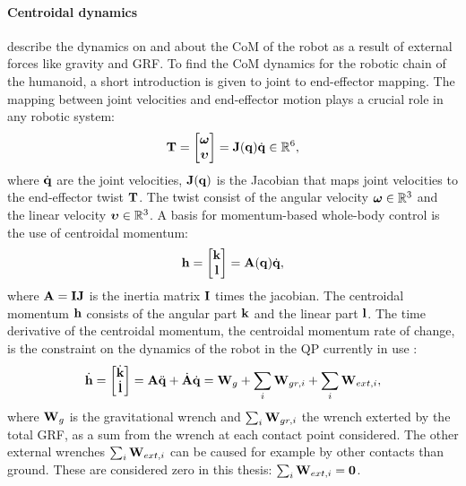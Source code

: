 \paragraph{Centroidal dynamics} \cite{orin2013centroidal} describe the dynamics on and about the \ac{CoM} of the robot as a result of external forces like gravity and \ac{GRF}. To find the \ac{CoM} dynamics for the robotic chain of the humanoid, a short introduction is given to joint to end-effector mapping. The mapping between joint velocities and end-effector motion plays a crucial role in any robotic system:
\begin{equation}\label{eq:jacobian}
\mathbf{T}=\begin{bmatrix}\boldsymbol{\omega} \\ \boldsymbol{\upsilon} \end{bmatrix} = \mathbf{J}(\mathbf{q})\dot{\mathbf{q}} \in \mathbb{R}^6,
\end{equation}
where $\dot{\mathbf{q}}$ are the joint velocities, $\mathbf{J}(\mathbf{q})$ is the Jacobian that maps joint velocities to the end-effector twist $\mathbf{T}$. The twist consist of the angular velocity $\boldsymbol{\omega} \in \mathbb{R}^3$ and the linear velocity $\boldsymbol{\upsilon} \in \mathbb{R}^3$. A basis for momentum-based whole-body control is the use of centroidal momentum:
\begin{equation}
\mathbf{h}=\begin{bmatrix}\mathbf{k} \\ \mathbf{l} \end{bmatrix} =\mathbf{A}(\mathbf{q})\dot{\mathbf{q}},
\end{equation}
 where $\mathbf{A}=\mathbf{I}\mathbf{J}$ is the inertia matrix $\mathbf{I}$ times the jacobian. The centroidal momentum $\mathbf{h}$ consists of the angular part $\mathbf{k}$ and the linear part $\mathbf{l}$. The time derivative of the centroidal momentum, the centroidal momentum rate of change, is the constraint on the dynamics of the robot in the \ac{QP} currently in use \cite{koolen2016design}:
\begin{equation}
\dot{\mathbf{h}}=\begin{bmatrix}\dot{\mathbf{k}}\\ \dot{\mathbf{l}} \end{bmatrix} =\mathbf{A}\ddot{\mathbf{q}} +\dot{\mathbf{A}}\dot{\mathbf{q}} = \mathbf{W}_g + \sum_i\mathbf{W}_{gr,i} + \sum_i \mathbf{W}_{ext,i}, 
\end{equation}
where $\mathbf{W}_g$ is the gravitational wrench and $\sum_i\mathbf{W}_{gr,i}$ the wrench exterted by the total \ac{GRF}, as a sum from the wrench at each contact point considered. The other external wrenches $\sum_i \mathbf{W}_{ext,i}$ can be caused for example by other contacts than ground. These are considered zero in this thesis: $\sum_i \mathbf{W}_{ext,i}=\mathbf{0}$.
